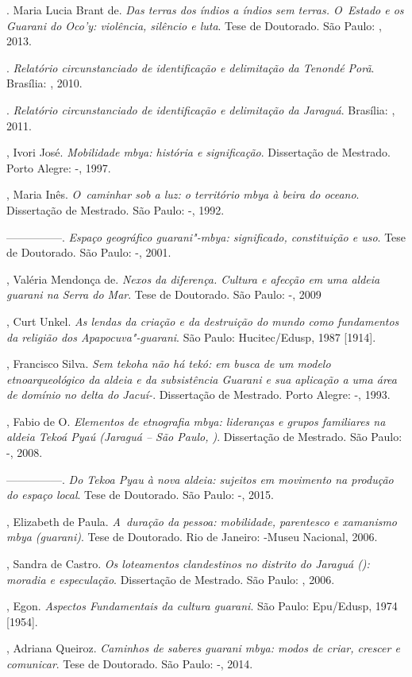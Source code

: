 \begin{Parskip}
. Maria Lucia Brant de. \emph{Das terras dos índios a índios sem
terras. O~Estado e os Guarani do Oco’y: violência, silêncio e luta}.
Tese de Doutorado. São Paulo: , 2013.

. \emph{Relatório circunstanciado de identificação e delimitação da 
Tenondé Porã}. Brasília: , 2010.

. \emph{Relatório circunstanciado de identificação e delimitação da 
Jaraguá}. Brasília: , 2011.

, Ivori José. \emph{Mobilidade mbya: história e significação}.
Dissertação de Mestrado. Porto Alegre: -, 1997.

, Maria Inês. \emph{O~caminhar sob a luz: o território mbya à beira do
oceano}. Dissertação de Mestrado. São Paulo: -, 1992. 

—————. \emph{Espaço geográfico guarani"-mbya: significado, constituição e
uso}. Tese de Doutorado. São Paulo: -, 2001.

, Valéria Mendonça de. \emph{Nexos da diferença. Cultura e afecção em
uma aldeia guarani na Serra do Mar}. Tese de Doutorado. São Paulo:
-, 2009

, Curt Unkel. \emph{As lendas da criação e da destruição do mundo
como fundamentos da religião dos Apapocuva"-guarani}. São Paulo:
Hucitec/Edusp, 1987 [1914].

, Francisco Silva. \emph{Sem tekoha não há tekó: em busca de um modelo
etnoarqueológico da aldeia e da subsistência Guarani e sua aplicação a
uma área de domínio no delta do Jacuí-}. Dissertação de Mestrado.
Porto Alegre: -, 1993.

  , Fabio de O. \emph{Elementos de etnografia mbya: lideranças
e grupos familiares na aldeia Tekoá Pyaú (Jaraguá – São Paulo, )}.
Dissertação de Mestrado. São Paulo: -, 2008.

—————. \emph{Do Tekoa Pyau à nova aldeia: sujeitos em movimento na produção do
espaço local}. Tese de Doutorado. São Paulo: -, 2015.

, Elizabeth de Paula. \emph{A~duração da pessoa: mobilidade,
parentesco e xamanismo mbya (guarani)}. Tese de Doutorado. Rio de
Janeiro: -Museu Nacional, 2006. 

, Sandra de Castro. \emph{Os loteamentos clandestinos no distrito do
Jaraguá (): moradia e especulação}. Dissertação de Mestrado. São
Paulo: , 2006.

, Egon. \emph{Aspectos Fundamentais da cultura guarani}. São Paulo:
Epu/Edusp, 1974 [1954].

, Adriana Queiroz. \emph{Caminhos de saberes guarani mbya: modos de
criar, crescer e comunicar}. Tese de Doutorado. São Paulo: -,
2014.
\end{Parskip}

